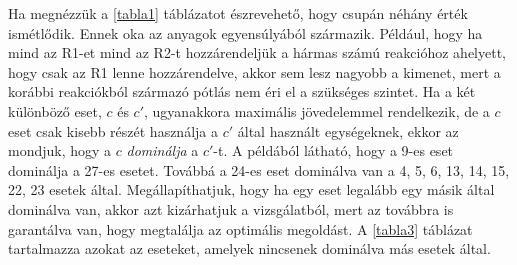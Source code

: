 Ha megnézzük a \ref{tabla1} táblázatot észrevehető, hogy csupán néhány érték ismétlődik. Ennek oka az anyagok egyensúlyából származik. Például, hogy ha mind az R1-et mind az R2-t hozzárendeljük a hármas számú reakcióhoz ahelyett, hogy csak az R1 lenne hozzárendelve, akkor sem lesz nagyobb a kimenet, mert a korábbi reakciókból származó pótlás nem éri el a szükséges szintet. Ha a két különböző eset, $c$ és $c'$, ugyanakkora maximális jövedelemmel rendelkezik, de a $c$ eset csak kisebb részét használja a $c'$ által használt egységeknek, ekkor az mondjuk, hogy a $c$ \textit{dominálja} a $c'$-t. A példából látható, hogy a 9-es eset dominálja a 27-es esetet. Továbbá a 24-es eset dominálva van a 4, 5, 6, 13, 14, 15, 22, 23 esetek által. Megállapíthatjuk, hogy ha egy eset legalább egy másik által dominálva van, akkor azt kizárhatjuk a vizsgálatból, mert az továbbra is garantálva van, hogy megtalálja az optimális megoldást. A \ref{tabla3} táblázat tartalmazza azokat az eseteket, amelyek nincsenek dominálva más esetek által. 

